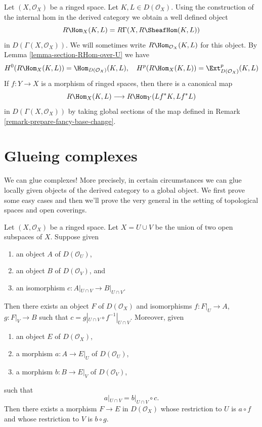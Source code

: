 \noindent
Let $(X, \mathcal{O}_X)$ be a ringed space. Let $K, L \in D(\mathcal{O}_X)$.
Using the construction of the internal hom in the derived category we
obtain a well defined object
$$
R\Hom_X(K, L) = R\Gamma(X, R\SheafHom(K, L))
$$
in $D(\Gamma(X, \mathcal{O}_X))$. We will sometimes write
$R\Hom_{\mathcal{O}_X}(K, L)$ for this object.
By Lemma \ref{lemma-section-RHom-over-U}
we have
$$
H^0(R\Hom_X(K, L)) = \Hom_{D(\mathcal{O}_X)}(K, L),
\quad
H^p(R\Hom_X(K, L)) = \Ext_{D(\mathcal{O}_X)}^p(K, L)
$$
If $f : Y \to X$ is a morphism of ringed spaces, then there is
a canonical map
$$
R\Hom_X(K, L) \longrightarrow R\Hom_Y(Lf^*K, Lf^*L)
$$
in $D(\Gamma(X, \mathcal{O}_X))$ by taking global sections of the map
defined in Remark \ref{remark-prepare-fancy-base-change}.








\section{Glueing complexes}
\label{section-glueing-complexes}

\noindent
We can glue complexes! More precisely, in certain circumstances we can
glue locally given objects of the derived category to a global object.
We first prove some easy cases and then we'll prove the very general
\cite[Theorem 3.2.4]{BBD}
in the setting of topological spaces and open coverings.

\begin{lemma}
\label{lemma-glue}
Let $(X, \mathcal{O}_X)$ be a ringed space. Let $X = U \cup V$ be
the union of two open subspaces of $X$. Suppose given
\begin{enumerate}
\item an object $A$ of $D(\mathcal{O}_U)$,
\item an object $B$ of $D(\mathcal{O}_V)$, and
\item an isomorphism $c : A|_{U \cap V} \to B|_{U \cap V}$.
\end{enumerate}
Then there exists an object $F$ of $D(\mathcal{O}_X)$
and isomorphisms $f : F|_U \to A$, $g : F|_V \to B$ such
that $c = g|_{U \cap V} \circ f^{-1}|_{U \cap V}$.
Moreover, given
\begin{enumerate}
\item an object $E$ of $D(\mathcal{O}_X)$,
\item a morphism $a : A \to E|_U$ of $D(\mathcal{O}_U)$,
\item a morphism $b : B \to E|_V$ of $D(\mathcal{O}_V)$,
\end{enumerate}
such that
$$
a|_{U \cap V}  = b|_{U \cap V} \circ c.
$$
Then there exists a morphism $F \to E$ in $D(\mathcal{O}_X)$
whose restriction to $U$ is $a \circ f$
and whose restriction to $V$ is $b \circ g$.
\end{lemma}


